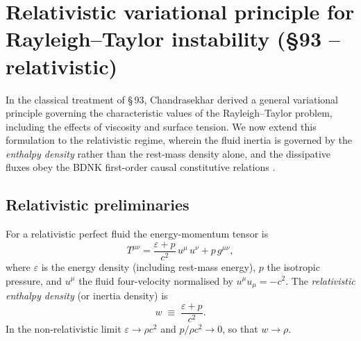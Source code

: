 %
%
%

\section{Relativistic variational principle for Rayleigh--Taylor
  instability (\S93 -- relativistic)}\label{sec:rel-10-93}

In the classical treatment of \S\,93, Chandrasekhar derived a general
variational principle governing the characteristic values of the
Rayleigh--Taylor problem, including the effects of viscosity and
surface tension.  We now extend this formulation to the relativistic
regime, wherein the fluid inertia is governed by the \emph{enthalpy
density} rather than the rest-mass density alone, and the dissipative
fluxes obey the BDNK first-order causal constitutive relations
\citep{BemficaDN2018,Kovtun2019}.

\subsection{Relativistic preliminaries}

For a relativistic perfect fluid the energy-momentum tensor is
\begin{equation}\label{eq:rel-10-Tmunu}
  T^{\mu\nu} = \frac{\varepsilon + p}{c^{2}}\,u^{\mu}\,u^{\nu}
  + p\,g^{\mu\nu},
\end{equation}
where $\varepsilon$ is the energy density (including rest-mass
energy), $p$ the isotropic pressure, and $u^{\mu}$ the fluid
four-velocity normalised by $u^{\mu}u_{\mu} = -c^{2}$.  The
\emph{relativistic enthalpy density} (or inertia density) is
\begin{equation}\label{eq:rel-10-enthalpy}
  w \;\equiv\; \frac{\varepsilon + p}{c^{2}}.
\end{equation}
In the non-relativistic limit $\varepsilon \to \rho c^{2}$ and
$p/\rho c^{2} \to 0$, so that $w \to \rho$.

